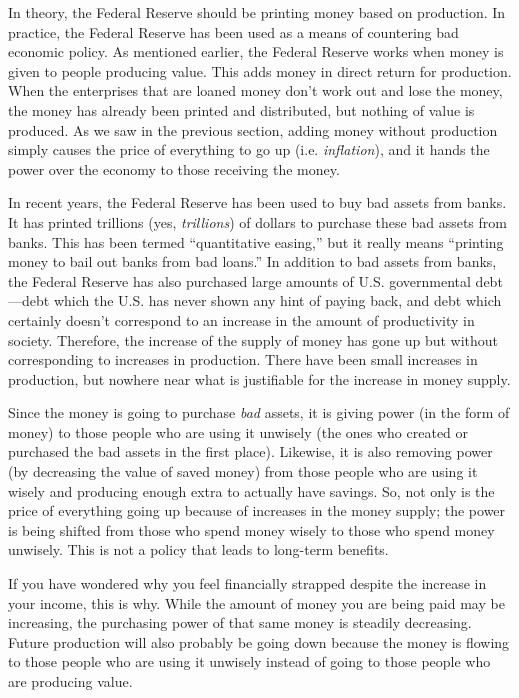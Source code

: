 In theory, the Federal Reserve should be printing money based on
production. In practice, the Federal Reserve has been used as a means
of countering bad economic policy. As mentioned earlier, the Federal
Reserve works when money is given to people producing value. This adds
money in direct return for production. When the enterprises that 
are loaned money don't work out and lose the money, 
the money has already been printed and distributed, but nothing of value is produced. As we saw
in the previous section, adding money without production simply causes
the price of everything to go up (i.e. \textit{inflation}), and it hands the power over the
economy to those receiving the money.

In recent years, the Federal Reserve has been used to buy bad assets
from banks. It has printed trillions (yes, \textit{trillions}) of
dollars to purchase these bad assets from banks. This has been termed
``quantitative easing,'' but it really means ``printing money to bail out
banks from bad loans.''  In addition to bad assets from banks, the
Federal Reserve has also purchased large amounts of U.S. governmental
debt---debt which the U.S. has never shown any hint of paying back, and
debt which certainly doesn't correspond to an increase in the amount
of productivity in society.
Therefore, the increase of the supply of money has gone up but without
corresponding to increases in production. There have been small
increases in production, but nowhere near what is justifiable for the
increase in money supply. 

Since the money is going to purchase
\textit{bad} assets, it is giving power (in the form of money) to those
people who are using it unwisely (the ones who created or purchased the
bad assets in the first place).  Likewise, it is also removing power
(by decreasing the value of saved money) from those people who are
using it wisely and
producing enough extra to actually have
savings.  So, not
only is the price of everything going up because of increases in the
money supply; the power is being shifted from those who spend money
wisely to those who spend money unwisely. This is not a policy that
leads to long-term benefits.

If you have wondered why you feel financially strapped despite the
increase in your income, this is why. While the amount of money you are
being paid may be increasing, the purchasing power of that same money
is steadily decreasing. Future production will also probably be going down
because the money is flowing to those people who are using it unwisely
instead of going to those people who are producing value.

